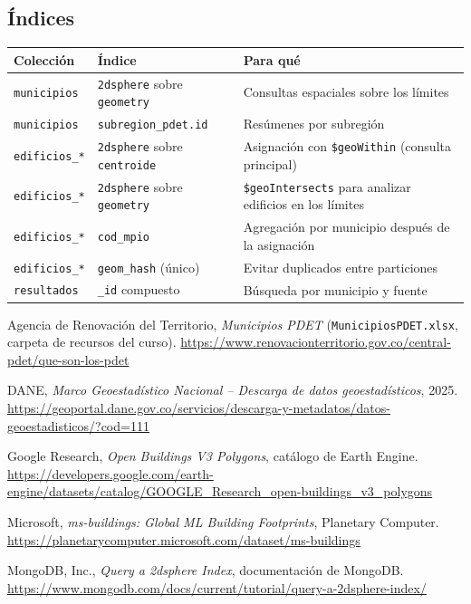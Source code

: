 \documentclass[11pt,a4paper]{article}
\newcommand{\campo}[1]{\texttt{#1}}
\begin{document}
\subsection{Índices}\begin{table}[H]
\centering\small
\begin{tabularx}{\textwidth}{@{}p{3.4cm}p{4.6cm}L@{}}
\toprule
\textbf{Colección} & \textbf{Índice} & \textbf{Para qué} \\
\midrule
\campo{municipios} & \campo{2dsphere} sobre \campo{geometry} & Consultas espaciales sobre los límites \\
\campo{municipios} & \campo{subregion\_pdet.id} & Resúmenes por subregión \\
\campo{edificios\_*} & \campo{2dsphere} sobre \campo{centroide} & Asignación con \campo{\$geoWithin} (consulta principal) \\
\campo{edificios\_*} & \campo{2dsphere} sobre \campo{geometry} & \campo{\$geoIntersects} para analizar edificios en los límites \\
\campo{edificios\_*} & \campo{cod\_mpio} & Agregación por municipio después de la asignación \\
\campo{edificios\_*} & \campo{geom\_hash} (único) & Evitar duplicados entre particiones \\
\campo{resultados} & \campo{\_id} compuesto & Búsqueda por municipio y fuente \\
\bottomrule
\end{tabularx}
\end{table}

\begin{thebibliography}{9}

Agencia de Renovación del Territorio, \emph{Municipios PDET}
(\texttt{MunicipiosPDET.xlsx}, carpeta de recursos del curso).
\url{https://www.renovacionterritorio.gov.co/central-pdet/que-son-los-pdet}

DANE, \emph{Marco Geoestadístico Nacional -- Descarga de datos
geoestadísticos}, 2025.
\url{https://geoportal.dane.gov.co/servicios/descarga-y-metadatos/datos-geoestadisticos/?cod=111}

Google Research, \emph{Open Buildings V3 Polygons}, catálogo de Earth Engine.
\url{https://developers.google.com/earth-engine/datasets/catalog/GOOGLE_Research_open-buildings_v3_polygons}

Microsoft, \emph{ms-buildings: Global ML Building Footprints}, Planetary
Computer.
\url{https://planetarycomputer.microsoft.com/dataset/ms-buildings}

MongoDB, Inc., \emph{Query a 2dsphere Index}, documentación de MongoDB.
\url{https://www.mongodb.com/docs/current/tutorial/query-a-2dsphere-index/}

\end{thebibliography}
\end{document}
